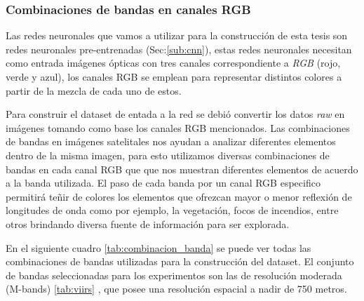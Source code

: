 \subsubsection{Combinaciones de bandas en canales RGB}\label{sub:comb_de_banda} 

Las redes neuronales que vamos a utilizar para la construcción de esta tesis son redes neuronales pre-entrenadas (Sec:\ref{sub:cnn}), estas redes neuronales necesitan como entrada imágenes ópticas con tres canales correspondiente a \textit{RGB} (rojo, verde y azul), los canales RGB se emplean para representar distintos colores a partir de la mezcla de cada uno de estos.

Para construir el dataset de entada a la red se debió convertir los datos \textit{raw} en imágenes tomando como base los canales RGB mencionados. Las combinaciones de bandas en imágenes satelitales nos ayudan a analizar diferentes elementos dentro de la misma imagen, para esto utilizamos diversas combinaciones de bandas en cada canal RGB que que nos muestran diferentes elementos de acuerdo a la banda utilizada. El paso de cada banda por un canal RGB especifico permitirá teñir de colores los elementos que ofrezcan mayor o menor reflexión de longitudes de onda como por ejemplo, la vegetación, focos de incendios, entre otros brindando diversa fuente de información para ser explorada. 

En el siguiente cuadro  \ref{tab:combinacion_banda} se puede ver todas las combinaciones de bandas utilizadas para la construcción del dataset. El conjunto de bandas seleccionadas para los experimentos son las de resolución moderada (M-bands) \ref{tab:viirs} , que posee una resolución espacial a nadir de 750 metros.

